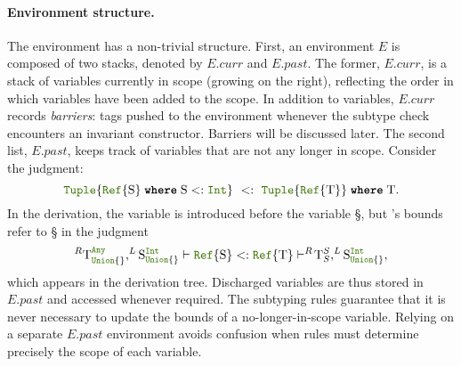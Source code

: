 \paragraph{Environment structure.}
The environment has a non-trivial structure.  First, an
environment $E$ is composed of two stacks, denoted by
$E.curr$ and $E.past$.  The former, $E.curr$, is a
stack of variables currently in scope (growing on the right),
reflecting the order in which variables have been added to the scope.
In addition to variables, $E.curr$ records \emph{barriers}: tags pushed
to the environment whenever the subtype check encounters an invariant
constructor.  Barriers will be discussed later.
The second list, $E.past$,
keeps track of variables that are not any longer in scope.  Consider
the judgment:
\[
    \tupletyp{\wheret{\cstrt{\jlname{Ref}}{\S}}{\S <: \jlname{Int}}} \ <:\ 
    \wheret{\tupletyp{\cstrt{\jlname{Ref}}{\T}}}{\T}.
\]
In the derivation, the variable
\T is introduced before the variable \S, but \T's bounds refer to \S
in the judgment
\[ ^R \T_{\uniontyp{}}^{\anytyp}, ^L \S_{\uniontyp{}}^{\jlname{Int}} \vdash
   \cstrt{\jlname{Ref}}{\S} <: \cstrt{\jlname{Ref}}{\T} \vdash 
   ^R\!\T_S^S, ^L \S_{\uniontyp{}}^{\jlname{Int}}, \]
which appears in the derivation tree.
Discharged variables are thus stored in \(E.past\) and accessed whenever
required.  The subtyping rules guarantee that it is never necessary to
update the bounds of a no-longer-in-scope variable.  Relying on a
separate \(E.past\) environment avoids confusion when rules must
determine precisely the scope of each variable.


